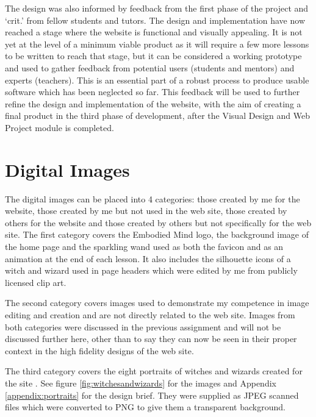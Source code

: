 \documentclass[a4paper, 12pt]{article}
\begin{document}
The design was also informed by feedback from the first phase of the project and `crit.' from fellow students and tutors. The design and implementation have now reached a stage where the website is functional and visually appealing. It is not yet at the level of a minimum viable product \citep{lenarduzzi2016mvp} as it will require a few more lessons to be written to reach that stage, but it can be considered a working prototype and used to gather feedback from potential users (students and mentors) and experts (teachers). This is an essential part of a robust process to produce usable software \citep{norman2013design} which has been neglected so far. This feedback will be used to further refine the design and implementation of the website, with the aim of creating a final product in the third phase of development, after the Visual Design and Web Project module is completed.

\section{Digital Images}
The digital images can be placed into 4 categories: those created by me for the website, those created by me but not used in the web site, those created by others for the website and those created by others but not specifically for the web site. The first category covers the Embodied Mind logo, the background image of the home page and the sparkling wand used as both the favicon and as an animation at the end of each lesson. It also includes the silhouette icons of a witch and wizard used in page headers which were edited by me from publicly licensed clip art. 

The second category covers images used to demonstrate my competence in image editing and creation and are not directly related to the web site. Images from both categories were discussed in the previous assignment and will not be discussed further here, other than to say they can now be seen in their proper context in the high fidelity designs of the web site.

The third category covers the eight portraits of witches and wizards created for the site \citep{mulligan2025witchesandwizards}. See figure \ref{fig:witchesandwizards} for the images and Appendix \ref{appendix:portraits} for the design brief. They were supplied as JPEG scanned files which were converted to PNG to give them a transparent background.
\end{document}
